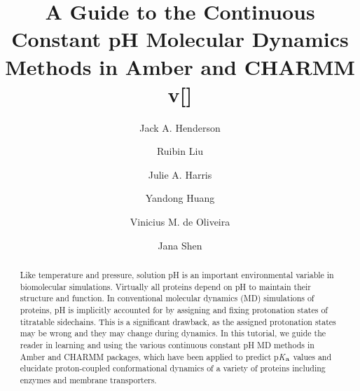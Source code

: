 \documentclass[9pt,tutorial]{livecoms}
\title{A Guide to the Continuous Constant pH Molecular Dynamics 
Methods in Amber and CHARMM v[\versionnumber]}
\author[1,\authfn{1},\authfn{2}]{Jack A. Henderson}
\author[1,\authfn{1}]{Ruibin Liu}
\author[1,\authfn{3}]{Julie A. Harris}
\author[1,\authfn{4}]{Yandong Huang}
\author[1]{Vinicius M. de Oliveira}
\author[1*]{Jana Shen}
\affil[1]{University of Maryland School of Pharmacy, Baltimore, MD}
\newcommand{\pka}{p\textit{K}$_{\rm a}$}
\begin{document}
\begin{frontmatter}
\maketitle

\begin{abstract}


Like temperature and pressure, solution pH is an important environmental variable in biomolecular simulations. 
Virtually all proteins depend on pH to maintain their structure and function. 
In conventional molecular dynamics (MD) simulations of proteins, pH is implicitly accounted for by assigning and fixing protonation states of titratable sidechains. This is a significant drawback, 
as the assigned protonation states may be wrong and they may change during dynamics.
In this tutorial, we guide the reader in learning and using the various continuous constant pH MD methods in Amber and CHARMM packages, which have been applied to predict {\pka} values and elucidate proton-coupled conformational dynamics of a variety of proteins including enzymes and membrane transporters.
\end{abstract}

\end{frontmatter}




\end{document}
